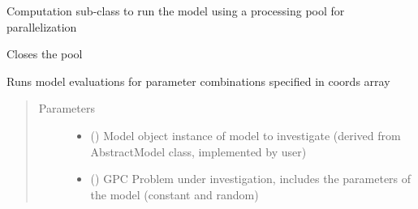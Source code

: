 \documentclass[letterpaper,10pt,english,openany,oneside]{sphinxmanual}
\begin{document}

\begin{fulllineitems}
\label{\detokenize{pygpc:pygpc.Computation.ComputationPoolMap}}
Computation sub-class to run the model using a processing pool for parallelization

\begin{fulllineitems}
\label{\detokenize{pygpc:pygpc.Computation.ComputationPoolMap.close}}
Closes the pool

\end{fulllineitems}


\begin{fulllineitems}
\label{\detokenize{pygpc:pygpc.Computation.ComputationPoolMap.run}}
Runs model evaluations for parameter combinations specified in coords array
\begin{quote}\begin{description}
\item[{Parameters}] \leavevmode\begin{itemize}
\item {} 
 () \textendash{} Model object instance of model to investigate (derived from AbstractModel class, implemented by user)

\item {} 
 () \textendash{} GPC Problem under investigation, includes the parameters of the model (constant and random)


\end{itemize}
\end{description}
\end{quote}
\end{fulllineitems}
\end{fulllineitems}
\end{document}
